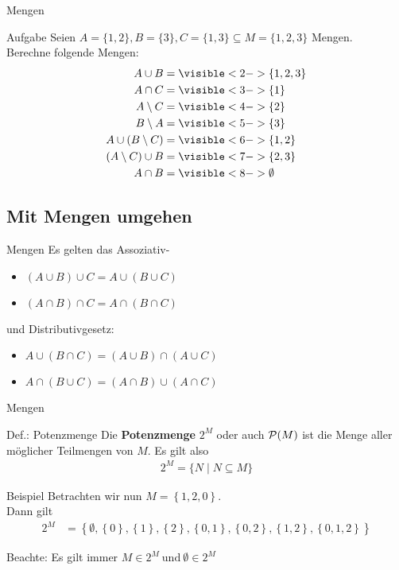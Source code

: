 	\begin{frame}{Mengen}
	\begin{exampleblock}{Aufgabe}
		Seien $A = \{1, 2\}, B = \{3\}, C = \{1, 3\}  \subseteq M = \{1, 2, 3\}$ Mengen.\\
		Berechne folgende Mengen:
		\begin{align*}
		A \cup B &= \visible<2->{ \{1, 2, 3\} }  \\
		A \cap C &= \visible<3->{ \{1\} }\\
		A \setminus C &= \visible<4->{ \{2\} }\\
		B \setminus A &= \visible<5->{ \{3\} }\\
		A \cup (B \setminus C) &= \visible<6->{ \{1, 2\} }\\
		(A \setminus C) \cup B &= \visible<7->{ \{2, 3\} }\\
		A \cap B &= \visible<8->{ \emptyset }
		\end{align*}
	\end{exampleblock}
\end{frame}

\subsection{Mit Mengen umgehen}
	\begin{frame}{Mengen}
		Es gelten das Assoziativ- \\
			\begin{itemize}
				\item $(A\cup B) \cup C=A\cup(B\cup C)$
				\item $(A\cap B) \cap C=A\cap(B\cap C)$
			\end{itemize}
		und Distributivgesetz:\\
			\begin{itemize}
				\item $A\cup(B \cap C)=(A\cup B)\cap (A\cup C)$
				\item $A\cap(B \cup C)=(A\cap B)\cup (A\cap C)$
			\end{itemize}
	\end{frame}

	\begin{frame}{Mengen}
		\begin{block}{Def.: Potenzmenge}
		Die \textbf{Potenzmenge} $2^M$ oder auch $\mathcal{P} (M)$ ist die Menge aller möglicher Teilmengen von $M$. Es gilt also 
		\begin{align*}
			2^M = \{N \mid N \subseteq M\}
		\end{align*}
		\end{block}
		\pause
		\begin{exampleblock}{Beispiel}
		Betrachten wir nun   $M = \left\{ 1,2,0 \right\} $. \\
		Dann gilt 
		\begin{align*}
		2^M &= \left\{ \emptyset, \left\{ 0 \right\}, \left\{ 1 \right\}, \left\{ 2 \right\}, \left\{ 0,1 \right\} , \left\{ 0,2 \right\}, \left\{ 1,2 \right\}, \left\{ 0,1,2 \right\} \right\}
		\end{align*}
		
		Beachte: Es gilt immer $M \in 2^M \ \text{und} \ \emptyset \in 2^M$
		\end{exampleblock}
	\end{frame}

